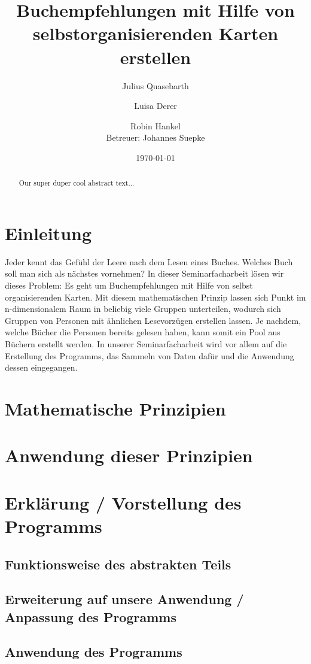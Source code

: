 \documentclass[a4paper]{article}
\title{Buchempfehlungen mit Hilfe von selbstorganisierenden Karten erstellen}
\author{Julius Quasebarth \and Luisa Derer \and Robin Hankel \\ Betreuer: Johannes Suepke}
\date{\today}
\begin{document}
\maketitle

\begin{otherlanguage}{english}
\begin{abstract}
Our super duper cool abstract text...
\end{abstract}
\end{otherlanguage}

\tableofcontents

\section{Einleitung}

Jeder kennt das Gefühl der Leere nach dem Lesen eines Buches. Welches Buch soll man sich als nächstes vornehmen? In dieser Seminarfacharbeit lösen wir dieses Problem: Es geht um Buchempfehlungen mit Hilfe von selbst organisierenden Karten. Mit diesem mathematischen Prinzip lassen sich Punkt im n-dimensionalem Raum in beliebig viele Gruppen unterteilen, wodurch sich Gruppen von Personen mit ähnlichen Lesevorzügen erstellen lassen. Je nachdem, welche Bücher die Personen bereits gelesen haben, kann somit ein \glqq{}Pool\grqq{} aus Büchern erstellt werden. In unserer Seminarfacharbeit wird vor allem auf die Erstellung des Programms, das Sammeln von Daten dafür und die Anwendung dessen eingegangen.

\section{Mathematische Prinzipien}

\section{Anwendung dieser Prinzipien}

\section{Erklärung / Vorstellung des Programms}

\subsection{Funktionsweise des abstrakten Teils}

\subsection{Erweiterung auf unsere Anwendung / Anpassung des Programms}

\subsection{Anwendung des Programms}
\end{document}
